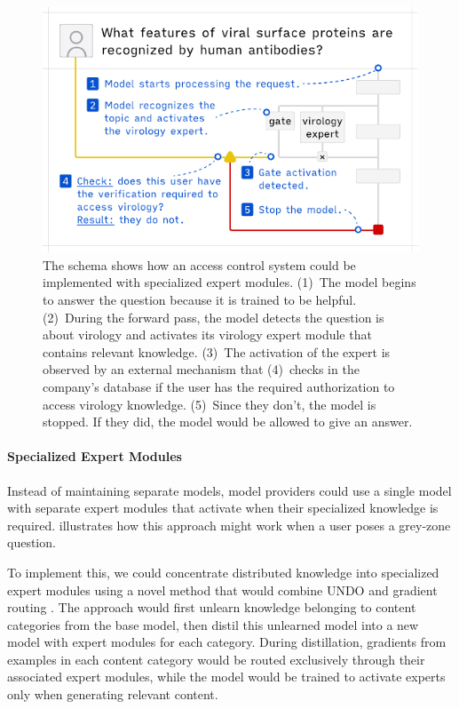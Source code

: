 \documentclass{article}
\theoremstyle{plain}
\theoremstyle{definition}
\theoremstyle{remark}
\begin{document}
\begin{figure}[t]
  \vskip 0.2in
  \begin{center}
    \centerline{\includegraphics[width=\columnwidth]{assets/experts.pdf}}
    \caption{
      The schema shows how an access control system could be implemented with specialized expert modules.
      (1)~The model begins to answer the question because it is trained to be helpful.
      (2)~During the forward pass, the model detects the question is about virology and activates its virology expert module that contains relevant knowledge.
      (3)~The activation of the expert is observed by an external mechanism that (4)~checks in the company's database if the user has the required authorization to access virology knowledge.
      (5)~Since they don't, the model is stopped.
      If they did, the model would be allowed to give an answer.
    }
    \label{figure:experts}
  \end{center}
  \vskip -0.2in
\end{figure}

\paragraph{Specialized Expert Modules}

Instead of maintaining separate models, model providers could use a single model with separate expert modules that activate when their specialized knowledge is required.
 illustrates how this approach might work when a user poses a grey-zone question.

To implement this, we could concentrate distributed knowledge into specialized expert modules using a novel method that would combine UNDO \cite{lee2025distillationrobustifiesunlearning} and gradient routing \cite{cloud2024gradientroutingmaskinggradients}.
The approach would first unlearn knowledge belonging to content categories from the base model, then distil this unlearned model into a new model with expert modules for each category.
During distillation, gradients from examples in each content category would be routed exclusively through their associated expert modules, while the model would be trained to activate experts only when generating relevant content.
\end{document}

